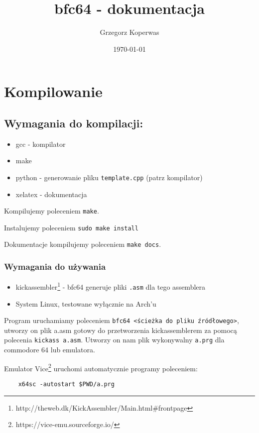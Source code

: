 \documentclass[a4paper,12pt]{article}
\title{bfc64 - dokumentacja}
\author{Grzegorz Koperwas}
\date{\today}
\begin{document}
    \maketitle
    \thispagestyle{fancy}

    \section{Kompilowanie}

    \subsection*{Wymagania do kompilacji:}
    \begin{itemize}
        \item gcc - kompilator
        \item make
        \item python - generowanie pliku \texttt{template.cpp} (patrz kompilator)
        \item xelatex - dokumentacja
    \end{itemize}

    Kompilujemy poleceniem \texttt{make}.
    
    Instalujemy poleceniem \texttt{sudo make install}

    Dokumentacje kompilujemy poleceniem \texttt{make docs}.

    \subsubsection*{Wymagania do używania}

    \begin{itemize}
        \item kickassembler\footnote{http://theweb.dk/KickAssembler/Main.html\#frontpage} - bfc64 generuje pliki \texttt{.asm} dla tego assemblera
        \item System Linux, testowane wyłącznie na Arch'u
    \end{itemize}

    Program uruchamiamy poleceniem \texttt{bfc64 <ścieżka do pliku źródłowego>}, utworzy on plik a.asm gotowy do przetworzenia kickassemblerem za pomocą polecenia \texttt{kickass a.asm}. Utworzy on nam plik wykonywalny \texttt{a.prg} dla commodore 64 lub emulatora.

    Emulator Vice\footnote{https://vice-emu.sourceforge.io/} uruchomi automatycznie programy poleceniem:
    \begin{lstlisting}
    x64sc -autostart $PWD/a.prg
    \end{lstlisting}
\end{document}
